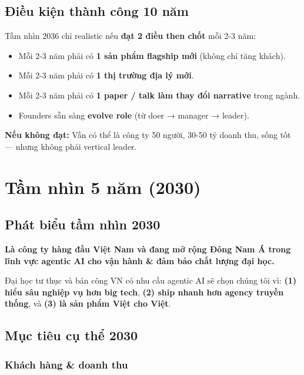 \documentclass[11pt,a4paper]{article}
\begin{document}
\subsection{Điều kiện thành công 10 năm}

Tầm nhìn 2036 chỉ realistic nếu \textbf{đạt 2 điều then chốt} mỗi 2-3 năm:

\begin{itemize}
\item Mỗi 2-3 năm phải có \textbf{1 sản phẩm flagship mới} (không chỉ tăng khách).
\item Mỗi 2-3 năm phải có \textbf{1 thị trường địa lý mới}.
\item Mỗi 2-3 năm phải có \textbf{1 paper / talk làm thay đổi narrative} trong ngành.
\item Founders sẵn sàng \textbf{evolve role} (từ doer → manager → leader).
\end{itemize}

\textbf{Nếu không đạt:} Vẫn có thể là công ty 50 người, 30-50 tỷ doanh thu, sống tốt --- nhưng không phải vertical leader.

\clearpage

\section{Tầm nhìn 5 năm (2030)}

\subsection{Phát biểu tầm nhìn 2030}

\begin{visionbox}[title=Tầm nhìn 2030]
\textbf{Là công ty hàng đầu Việt Nam và đang mở rộng Đông Nam Á trong lĩnh vực
agentic AI cho vận hành \& đảm bảo chất lượng đại học.}

Đại học tư thục và bán công VN có nhu cầu agentic AI sẽ chọn chúng tôi vì:
\textbf{(1) hiểu sâu nghiệp vụ hơn big tech}, \textbf{(2) ship nhanh hơn agency truyền
thống}, và \textbf{(3) là sản phẩm Việt cho Việt}.
\end{visionbox}

\subsection{Mục tiêu cụ thể 2030}

\subsubsection*{Khách hàng \& doanh thu}
\end{document}
